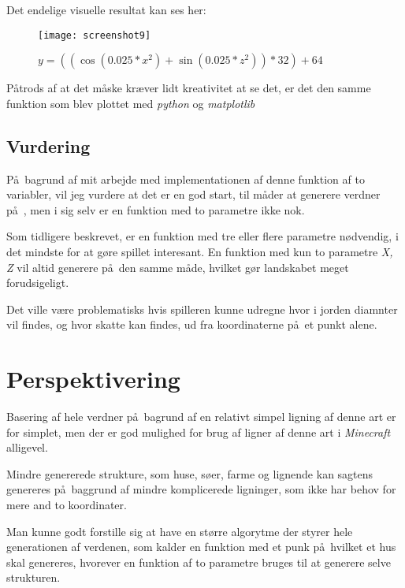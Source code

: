 \documentclass[a4paper,12pt]{report}
\begin{document}
			Det endelige visuelle resultat kan ses her:

			\begin{figure}[h]
				\texttt{[image: screenshot9]}
				\caption{\(y = ((\cos (0.025 * x^2) + \sin (0.025 * z^2)) * 32) + 64\)}
			\end{figure}

			P\aa trods af at det m\aa ske kr\ae ver lidt kreativitet at se det, er det den samme funktion som blev
			plottet med \emph{python} og \emph{matplotlib}
	\section{Vurdering}
		P\aa \ bagrund af mit arbejde med implementationen af denne funktion af to variabler, vil jeg vurdere
		at det er en god start, til m\aa der at generere verdner p\aa \ , men i sig selv er en funktion med to parametre ikke nok.

		Som tidligere beskrevet, er en funktion med tre eller flere parametre n\o dvendig, i det mindste for at g\o re spillet interesant.
		En funktion med kun to parametre \emph{X, Z} vil altid generere p\aa \ den samme m\aa de, hvilket g\o r landskabet
		meget forudsigeligt.

		Det ville v\ae re problematisks hvis spilleren kunne udregne hvor i jorden diamnter vil findes, og hvor skatte kan findes, ud fra
		koordinaterne p\aa \ et punkt alene.
	\chapter{Perspektivering}
		Basering af hele verdner p\aa \ bagrund af en relativt simpel ligning af denne art er for simplet, men
		der er god mulighed for brug af ligner af denne art i \emph{Minecraft} alligevel.

		Mindre genererede strukture, som huse, s\o er, farme og lignende kan sagtens genereres p\aa \ baggrund af
		mindre komplicerede ligninger, som ikke har behov for mere and to koordinater.

		Man kunne godt forstille sig at have en st\o rre algorytme der styrer hele generationen af verdenen,
		som kalder en funktion med et punk p\aa \ hvilket et hus skal genereres, hvorever en funktion af
		to parametre bruges til at generere selve strukturen.
\end{document}
